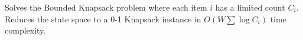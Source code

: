 
Solves the Bounded Knapsack problem where each item $i$ has a limited count $C_i$. Reduces the state space to a 0-1 Knapsack instance in $O(W \sum \log C_i)$ time complexity.

